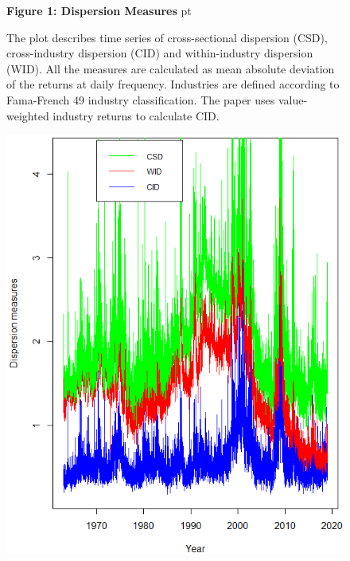\documentclass[16pt]{article}
\begin{document}
\begin{figure}
\textbf{Figure 1: Dispersion Measures}
 pt
\begin{flushleft}
{The plot describes time series of cross-sectional dispersion (CSD), cross-industry dispersion (CID) and within-industry dispersion (WID). All the measures are calculated as mean absolute deviation of the returns at daily frequency. Industries are defined according to Fama-French 49 industry classification. The paper uses value-weighted industry returns to calculate CID.}
\end{flushleft}
\centering
\includegraphics[width=1\textwidth]{fig1.png}
\end{figure}
\end{document}
